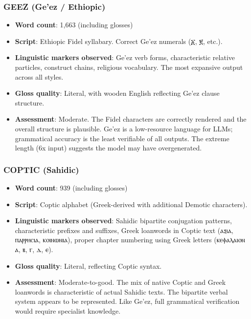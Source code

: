 \documentclass[10pt, letterpaper, twocolumn]{article}
\providecommand{\tightlist}{\setlength{\itemsep}{0pt}\setlength{\parskip}{0pt}}
\begin{document}
\subsubsection*{GEEZ (Ge'ez / Ethiopic)}\label{geez-geez-ethiopic}

\begin{itemize}
\tightlist
\item
  \textbf{Word count}: 1,663 (including glosses)
\item
  \textbf{Script}: Ethiopic Fidel syllabary. Correct Ge'ez numerals (፩, ፪, etc.).
\item
  \textbf{Linguistic markers observed}: Ge'ez verb forms, characteristic relative particles, construct chains, religious vocabulary. The most expansive output across all styles.
\item
  \textbf{Gloss quality}: Literal, with wooden English reflecting Ge'ez clause structure.
\item
  \textbf{Assessment}: Moderate. The Fidel characters are correctly rendered and the overall structure is plausible. Ge'ez is a low-resource language for LLMs; grammatical accuracy is the least verifiable of all outputs. The extreme length (6x input) suggests the model may have overgenerated.
\end{itemize}

\subsubsection*{COPTIC (Sahidic)}\label{coptic-sahidic}

\begin{itemize}
\tightlist
\item
  \textbf{Word count}: 939 (including glosses)
\item
  \textbf{Script}: Coptic alphabet (Greek-derived with additional Demotic characters).
\item
  \textbf{Linguistic markers observed}: Sahidic bipartite conjugation patterns, characteristic prefixes and suffixes, Greek loanwords in Coptic text (ⲁⲝⲓⲁ, ⲡⲁⲣⲣⲏⲥⲓⲁ, ⲕⲟⲓⲛⲱⲛⲓⲁ), proper chapter numbering using Greek letters (ⲕⲉⲫⲁⲗⲁⲓⲟⲛ ⲁ, ⲃ, ⲅ, ⲇ, ⲉ).
\item
  \textbf{Gloss quality}: Literal, reflecting Coptic syntax.
\item
  \textbf{Assessment}: Moderate-to-good. The mix of native Coptic and Greek loanwords is characteristic of actual Sahidic texts. The bipartite verbal system appears to be represented. Like Ge'ez, full grammatical verification would require specialist knowledge.
\end{itemize}
\end{document}
